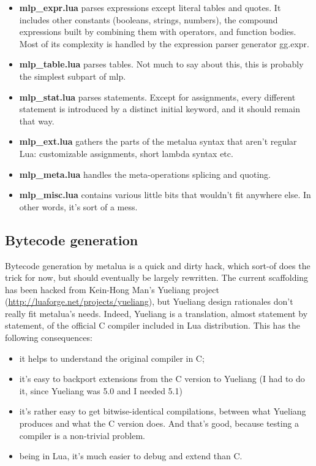 \begin{itemize}
\item {\bf mlp\_expr.lua} parses expressions except literal tables
  and quotes. It includes other constants (booleans, strings,
  numbers), the compound expressions built by combining them with
  operators, and function bodies. Most of its complexity is handled by
  the expression parser generator gg.expr.
\item {\bf mlp\_table.lua} parses tables. Not much to say about this,
  this is probably the simplest subpart of mlp.
\item {\bf mlp\_stat.lua} parses statements. Except for assignments,
  every different statement is introduced by a distinct initial
  keyword, and it should remain that way.
\item {\bf mlp\_ext.lua} gathers the parts of the metalua syntax that
  aren't regular Lua: customizable assignments, short lambda syntax
  etc. 
\item {\bf mlp\_meta.lua} handles the meta-operations splicing and
  quoting.
\item {\bf mlp\_misc.lua} contains various little bits that wouldn't
  fit anywhere else. In other words, it's sort of a mess.
\end{itemize}

\subsection{Bytecode generation}
Bytecode generation by metalua is a quick and dirty hack, which
sort-of does the trick for now, but should eventually be largely
rewritten. The current scaffolding has been hacked from Kein-Hong
Man's Yueliang project (\url{http://luaforge.net/projects/yueliang}),
but Yueliang design rationales don't really fit metalua's
needs. Indeed, Yueliang is a translation, almost statement by
statement, of the official C compiler included in Lua
distribution. This has the following consequences:

\begin{itemize}
\item it helps to understand the original compiler in C;
\item it's easy to backport extensions from the C version to Yueliang
  (I had to do it, since Yueliang was 5.0 and I needed 5.1)
\item it's rather easy to get bitwise-identical compilations, between
  what Yueliang produces and what the C version does. And that's good,
  because testing a compiler is a non-trivial problem.
\item being in Lua, it's much easier to debug and extend than C.
\end{itemize}

